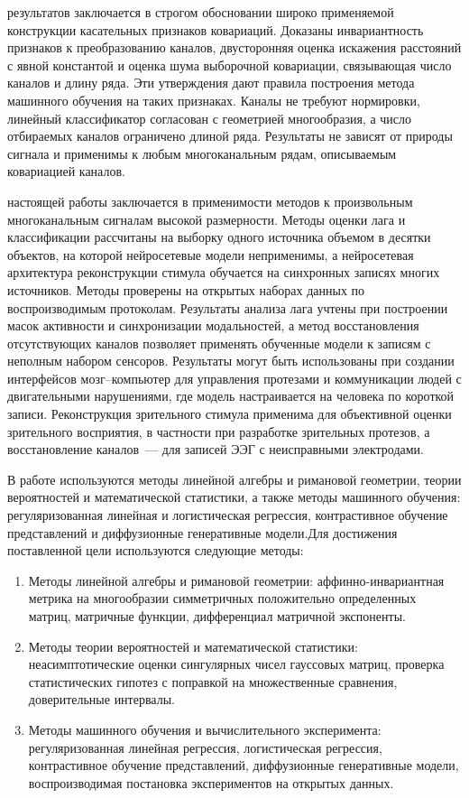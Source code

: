 {\tinfluence} результатов заключается в строгом обосновании широко применяемой конструкции касательных признаков ковариаций. Доказаны инвариантность признаков к преобразованию каналов, двусторонняя оценка искажения расстояний с явной константой и оценка шума выборочной ковариации, связывающая число каналов и длину ряда. Эти утверждения дают правила построения метода машинного обучения на таких признаках. Каналы не требуют нормировки, линейный классификатор согласован с геометрией многообразия, а число отбираемых каналов ограничено длиной ряда. Результаты не зависят от природы сигнала и применимы к любым многоканальным рядам, описываемым ковариацией каналов.

{\pinfluence} настоящей работы заключается в применимости методов к произвольным многоканальным сигналам высокой размерности. Методы оценки лага и классификации рассчитаны на выборку одного источника объемом в десятки объектов, на которой нейросетевые модели неприменимы, а нейросетевая архитектура реконструкции стимула обучается на синхронных записях многих источников. Методы проверены на открытых наборах данных по воспроизводимым протоколам. Результаты анализа лага учтены при построении масок активности и синхронизации модальностей, а метод восстановления отсутствующих каналов позволяет применять обученные модели к записям с неполным набором сенсоров. Результаты могут быть использованы при создании интерфейсов мозг--компьютер для управления протезами и коммуникации людей с двигательными нарушениями, где модель настраивается на человека по короткой записи. Реконструкция зрительного стимула применима для объективной оценки зрительного восприятия, в частности при разработке зрительных протезов, а восстановление каналов~--- для записей ЭЭГ с неисправными электродами.

{\methods} \ifsynopsis В работе используются методы линейной алгебры и римановой геометрии, теории вероятностей и математической статистики, а также методы машинного обучения: регуляризованная линейная и логистическая регрессия, контрастивное обучение представлений и диффузионные генеративные модели.\else Для достижения поставленной цели используются следующие методы:
\begin{enumerate}[beginpenalty=10000]
    \item Методы линейной алгебры и римановой геометрии: аффинно-инвариантная метрика на многообразии симметричных положительно определенных матриц, матричные функции, дифференциал матричной экспоненты.
    \item Методы теории вероятностей и математической статистики: неасимптотические оценки сингулярных чисел гауссовых матриц, проверка статистических гипотез с поправкой на множественные сравнения, доверительные интервалы.
    \item Методы машинного обучения и вычислительного эксперимента: регуляризованная линейная регрессия, логистическая регрессия, контрастивное обучение представлений, диффузионные генеративные модели, воспроизводимая постановка экспериментов на открытых данных.
\end{enumerate}
\fi

